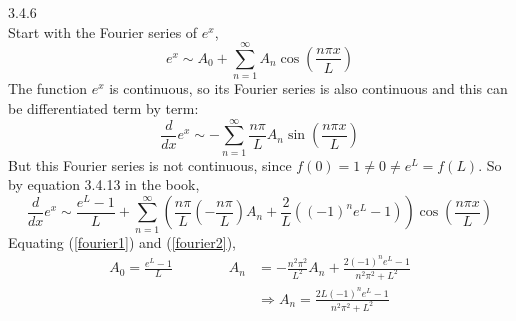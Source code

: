 \documentclass{article}
\theoremstyle{definition}
\begin{document}
	\begin{prob}{3.4.6} $  $ \vspace{1mm} \\
		Start with the Fourier series of $ e^x $,
		\[
			e^x \sim A_0 + \sum\limits_{n=1}^{\infty} A_n \cos\left( \frac{n\pi x}{L} \right)
		\]
		The function $ e^x $ is continuous, so its Fourier series is also continuous and this can be differentiated term by term:
		\begin{equation}\label{fourier1}
			\frac{d}{dx} e^x \sim - \sum\limits_{n=1}^{\infty} \frac{n\pi}{L} A_n \sin\left( \frac{n\pi x}{L} \right)
		\end{equation}
		But this Fourier series is not continuous, since $ f(0) = 1 \neq 0 \neq e^L = f(L) $. So by equation 3.4.13 in the book,
		\begin{equation}\label{fourier2}
			\frac{d}{dx} e^x \sim \frac{e^L-1}{L} + \sum\limits_{n=1}^{\infty} \left( \frac{n\pi}{L} \left( -\frac{n\pi}{L} \right) A_n + \frac{2}{L} ((-1)^ne^L-1) \right) \cos\left( \frac{n\pi x}{L} \right)
		\end{equation}
		Equating (\ref{fourier1}) and (\ref{fourier2}),
		\begin{align*}
			\boxed{ A_0 = \frac{e^L-1}{L} } \qquad \qquad  A_n &= -\frac{n^2\pi^2}{L^2} A_n + \frac{2(-1)^n e^L-1}{n^2\pi^2 + L^2} \\
			&\Rightarrow \boxed {A_n = \frac{2L(-1)^n e^L-1}{n^2\pi^2 + L^2}}
		\end{align*}
	\end{prob}
	
	
    
    
    
\end{document}
